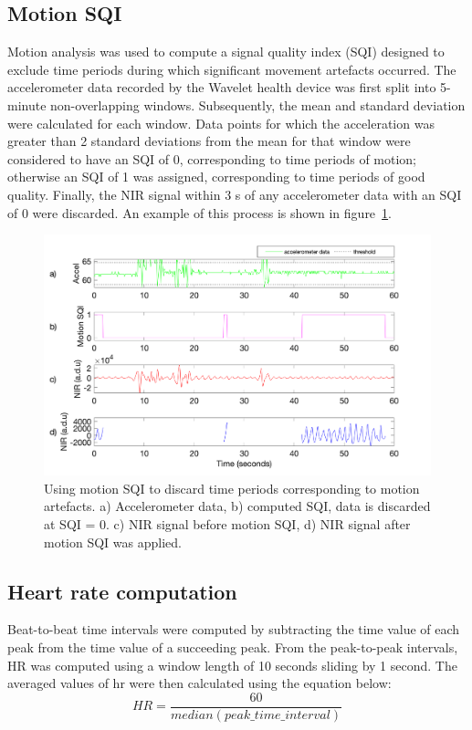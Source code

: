 \subsection{Motion SQI}

Motion analysis was used to compute a signal quality index (SQI) designed to exclude time periods during which significant movement artefacts occurred. The accelerometer data recorded by the Wavelet health device was first split into 5-minute non-overlapping windows. Subsequently, the mean and standard deviation were calculated for each window. Data points for which the acceleration was greater than \pm{}2 standard deviations from the mean for that window were considered to have an SQI of 0, corresponding to time periods of motion; otherwise an SQI of 1 was assigned, corresponding to time periods of good quality. Finally, the NIR signal within \pm{}3 s of any accelerometer data with an SQI of 0 were discarded. An example of this process is shown in figure~\ref{SQIACC}.


\begin{figure}
\centering
\includegraphics[width = 12 cm]{./figures/SQI.png}
    \caption[Using motion SQI to discard time periods corresponding to motion artefacts.]{Using motion SQI to discard time periods corresponding to motion artefacts. a) Accelerometer data, b) computed SQI, data is discarded at SQI = 0. c) NIR signal before motion SQI, d) NIR signal after motion SQI was applied.}
    \label{SQIACC}
\end{figure}


 
 \subsection{Heart rate computation}
 
Beat-to-beat time intervals were computed by subtracting the time value of each peak from the time value of a succeeding peak.
From the peak-to-peak intervals, HR was computed using a window length of 10 seconds sliding by 1 second. The averaged values of \gls{hr} were then calculated using the equation below:
\begin{equation}
HR = \frac{60}{median (peak\_time\_interval)}
\end{equation}
 
